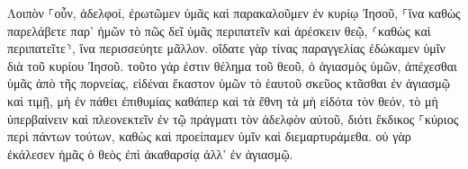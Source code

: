 \documentclass{openreader}
\begin{document}
Λοιπὸν ⸀οὖν, ἀδελφοί, ἐρωτῶμεν ὑμᾶς καὶ παρακαλοῦμεν ἐν κυρίῳ Ἰησοῦ, ⸀ἵνα καθὼς παρελάβετε παρ’ ἡμῶν τὸ πῶς δεῖ ὑμᾶς περιπατεῖν καὶ ἀρέσκειν θεῷ, ⸂καθὼς καὶ περιπατεῖτε⸃, ἵνα περισσεύητε μᾶλλον. 
οἴδατε γὰρ τίνας παραγγελίας ἐδώκαμεν ὑμῖν διὰ τοῦ κυρίου Ἰησοῦ. 
τοῦτο γάρ ἐστιν θέλημα τοῦ θεοῦ, ὁ ἁγιασμὸς ὑμῶν, ἀπέχεσθαι ὑμᾶς ἀπὸ τῆς πορνείας, 
εἰδέναι ἕκαστον ὑμῶν τὸ ἑαυτοῦ σκεῦος κτᾶσθαι ἐν ἁγιασμῷ καὶ τιμῇ, 
μὴ ἐν πάθει ἐπιθυμίας καθάπερ καὶ τὰ ἔθνη τὰ μὴ εἰδότα τὸν θεόν, 
τὸ μὴ ὑπερβαίνειν καὶ πλεονεκτεῖν ἐν τῷ πράγματι τὸν ἀδελφὸν αὐτοῦ, διότι ἔκδικος ⸀κύριος περὶ πάντων τούτων, καθὼς καὶ προείπαμεν ὑμῖν καὶ διεμαρτυράμεθα. 
οὐ γὰρ ἐκάλεσεν ἡμᾶς ὁ θεὸς ἐπὶ ἀκαθαρσίᾳ ἀλλ’ ἐν ἁγιασμῷ. 
\end{document}
